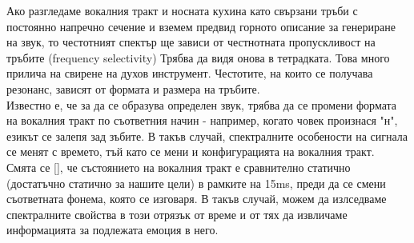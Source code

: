 \documentclass[main.tex]{subfiles}
\begin{document}
    Ако разгледаме вокалния тракт и носната кухина като свързани тръби с постоянно напречно сечение и вземем предвид горното описание за генериране на звук,
    то честотният спектър ще зависи от честнотната пропускливост на тръбите (frequency selectivity) Трябва да видя онова в тетрадката. Това много прилича на свирене на духов инструмент.
    Честотите, на които се получава резонанс, зависят от формата и размера на тръбите.\\
    Известно е, че за да се образува определен звук, трябва да се промени формата на вокалния тракт по 
    съответния начин - например, когато човек произнася "н", езикът се залепя зад зъбите. В такъв случай, спектралните особености на сигнала се менят с времето, тъй като се мени и
    конфигурацията на вокалния тракт.\\
    Смята се [], че състоянието на вокалния тракт е сравнително статично (достатъчно статично за нашите цели) в рамките на 15ms, преди да се смени съответната
    фонема, която се изговаря. В такъв случай, можем да излседваме спектралните свойства в този отрязък от време и от тях да извличаме информацията за подлежата емоция в него. 
\end{document}
